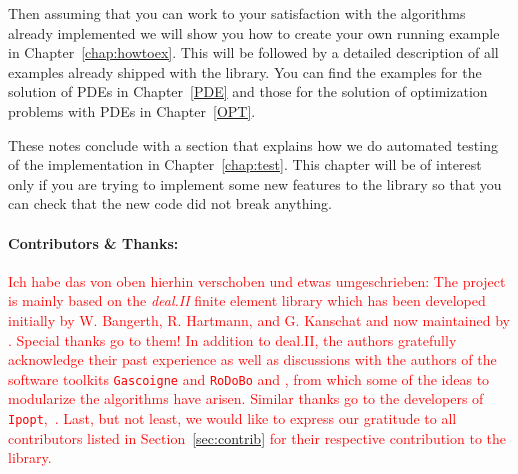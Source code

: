 Then assuming that you can work to your satisfaction with the algorithms already implemented
we will show you how to create your own running example in Chapter~\ref{chap:howtoex}.
This will be followed by a detailed description of all examples already shipped with 
the library. You can find the examples for the solution of PDEs in Chapter~\ref{PDE}
and those for the solution of optimization problems with PDEs in Chapter~\ref{OPT}.

These notes conclude with a section that explains how we do automated testing of the 
implementation in Chapter~\ref{chap:test}. This chapter will be of interest only if you 
are trying to implement some new features to the library so that you can check that 
the new code did not break anything.

\paragraph{Contributors \& Thanks:}
\textcolor{red}{Ich habe das von oben hierhin verschoben und etwas 
umgeschrieben:
The \dope{} project is 
mainly based on the \textit{deal.II} finite element library which has been developed
 initially by W. Bangerth, R. Hartmann, and G. Kanschat \cite{deal} and 
now maintained by \cite{deal2}. Special thanks go to them!
In addition to deal.II, the authors 
gratefully acknowledge their past experience as well as discussions with 
the authors of  
the software toolkits \texttt{Gascoigne} and \texttt{RoDoBo}
\cite{Gascoigne} and \cite{rodobo-web}, 
from which some of the ideas to modularize the algorithms have arisen.
Similar thanks go to the developers of \texttt{Ipopt},~\cite{ipopt}.
Last, but not least, we would like to express our gratitude 
to all contributors listed in Section~\ref{sec:contrib}
for their respective contribution to the library.
}
 

%
%
%
%






